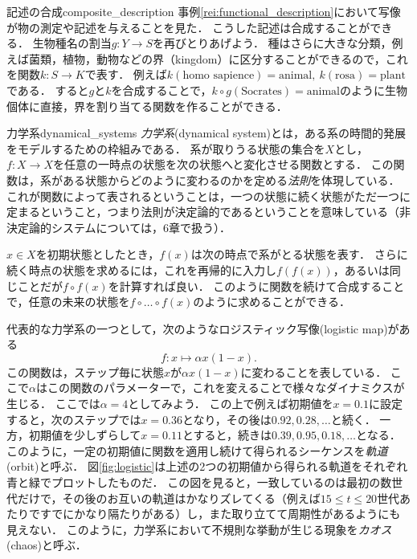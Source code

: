 \documentclass[11pt,a4paper]{bxjsarticle}
\begin{document}
\begin{rei}{記述の合成}{composite_description}
 事例\ref{rei:functional_description}において写像が物の測定や記述を与えることを見た．
 こうした記述は合成することができる．
 生物種名の割当$g:Y \to S$を再びとりあげよう．
 種はさらに大きな分類，例えば菌類，植物，動物などの界（kingdom）に区分することができるので，これを関数$k:S \to K$で表す．
 例えば$k(\text{homo sapience}) = \text{animal}, \ k(\text{rosa}) = \text{plant}$である．
 すると$g$と$k$を合成することで，$k \circ g(\text{Socrates}) = \text{animal}$のように生物個体に直接，界を割り当てる関数を作ることができる．
\end{rei}

\begin{rei}{力学系}{dynamical_systems}
      \emph{力学系}(dynamical system)とは，ある系の時間的発展をモデルするための枠組みである．
      系が取りうる状態の集合を$X$とし，$f:X \to X$を任意の一時点の状態を次の状態へと変化させる関数とする．
      この関数は，系がある状態からどのように変わるのかを定める\emph{法則}を体現している．
      これが関数によって表されるということは，一つの状態に続く状態がただ一つに定まるということ，つまり法則が決定論的であるということを意味している（非決定論的システムについては，6章で扱う）．

      $x\in X$を初期状態としたとき，$f(x)$は次の時点で系がとる状態を表す．
      さらに続く時点の状態を求めるには，これを再帰的に入力し$f(f(x))$，あるいは同じことだが$f \circ f(x)$を計算すれば良い．
      このように関数を続けて合成することで，任意の未来の状態を$f \circ \dots \circ f(x)$のように求めることができる．

      代表的な力学系の一つとして，次のようなロジスティック写像(logistic map)がある
      \[ f: x \mapsto \alpha x (1-x). \]
      この関数は，ステップ毎に状態$x$が$\alpha x (1-x)$に変わることを表している．
      ここで$\alpha$はこの関数のパラメーターで，これを変えることで様々なダイナミクスが生じる．
      ここでは$\alpha=4$としてみよう．
      この上で例えば初期値を$x=0.1$に設定すると，次のステップでは$x=0.36$となり，その後は$0.92, 0.28, \dots$と続く．
      一方，初期値を少しずらして$x=0.11$とすると，続きは$0.39, 0.95, 0.18, \dots$となる．
      このように，一定の初期値に関数を適用し続けて得られるシーケンスを\emph{軌道}(orbit)と呼ぶ．
      図\ref{fig:logistic}は上述の2つの初期値から得られる軌道をそれぞれ青と緑でプロットしたものだ．
      この図を見ると，一致しているのは最初の数世代だけで，その後のお互いの軌道はかなりズレてくる（例えば$15 \leq t \leq 20$世代あたりですでにかなり隔たりがある）し，また取り立てて周期性があるようにも見えない．
      このように，力学系において不規則な挙動が生じる現象を\emph{カオス}(chaos)と呼ぶ．
\end{rei}
\end{document}
